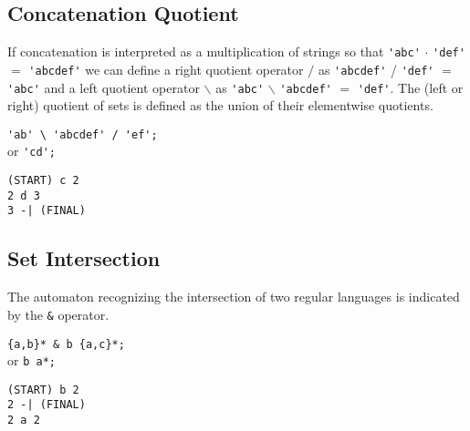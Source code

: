 \subsection{Concatenation Quotient}
If concatenation is interpreted as a multiplication of strings so that
\verb#'abc'# $\cdot$ \verb#'def'# $=$ \verb#'abcdef'# we can define a right
quotient operator $/$ as \verb#'abcdef'# / \verb#'def'# $=$ \verb#'abc'#
and a left quotient operator $\backslash$ as \verb#'abc'# $\backslash$
\verb#'abcdef'# $=$ \verb#'def'#.
The (left or right) quotient of sets is defined as the union of their
elementwise quotients.
\begin{center}\begin{minipage}[t]{3in}\begin{minipage}[t]{3in}\begin{tabbing}
\qquad \= \verb#'ab' \ 'abcdef' / 'ef';#\\
or \> \verb#'cd';#
\end{tabbing}\end{minipage}\end{minipage}
\begin{minipage}[t]{1.6in}\begin{verbatim}
(START) c 2
2 d 3
3 -| (FINAL)
\end{verbatim}\end{minipage}\end{center}

\subsection{Set Intersection}
The automaton recognizing the intersection of two regular languages is
indicated by the \verb#&# operator.
\begin{center}\begin{minipage}[t]{3in}\begin{minipage}[t]{3in}\begin{tabbing}
\qquad \= \verb#{a,b}* & b {a,c}*;#\\
or \> \verb#b a*;#
\end{tabbing}\end{minipage}\end{minipage}
\begin{minipage}[t]{1.6in}\begin{verbatim}
(START) b 2
2 -| (FINAL)
2 a 2
\end{verbatim}\end{minipage}\end{center}

